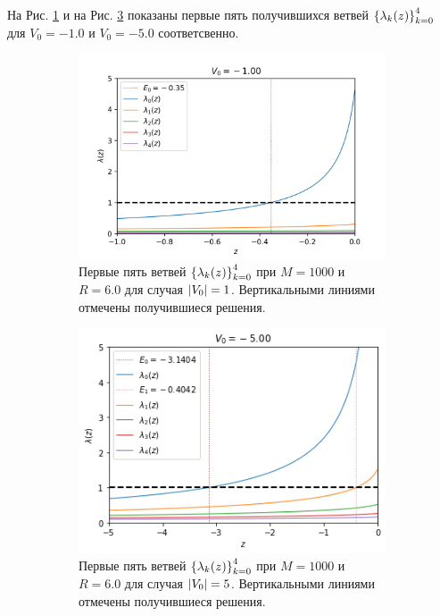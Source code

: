 \documentclass[10pt]{article}
\begin{document}
На Рис. \ref{fig:-1.0_l5} и на Рис. \ref{fig:-5.0_l5} показаны первые пять получившихся ветвей $\qty{\lambda_k(z)}_{k=0}^4$ для $V_0 = -1.0$ и $V_0=-5.0$ соответсвенно.
\begin{figure}[htbp]
 \centering
 \begin{subfigure}[b]{0.49\textwidth}
    \includegraphics[width=\textwidth]{../figures/-1.0_l5}
    \caption{Первые пять ветвей $\qty{\lambda_k(z)}_{k=0}^4$ при $M=1000$ и $R=6.0$ для случая $\abs{V_0}=1$. Вертикальными линиями отмечены получившиеся решения.}
    \label{fig:-1.0_l5}
\end{subfigure}
\hfill
 \begin{subfigure}[b]{0.49\textwidth}
    \includegraphics[width=\textwidth]{../figures/-5.0_l5}
    \caption{Первые пять ветвей $\qty{\lambda_k(z)}_{k=0}^4$ при $M=1000$ и $R=6.0$ для случая $\abs{V_0}=5$. Вертикальными линиями отмечены получившиеся решения.}
    \label{fig:-5.0_l5}
\end{subfigure}
\caption{}
\end{figure}
\end{document}
